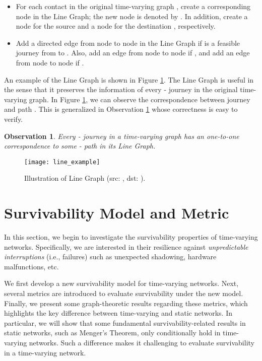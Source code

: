 \documentclass[10pt, conference, letterpaper]{IEEEtran}
\newtheorem{observation}{Observation}
\begin{document}
\begin{itemize}[leftmargin=0.3cm,itemsep=1mm,topsep=1mm]
\item {For each contact  in the original time-varying graph , create a corresponding node in the Line Graph; the new node is denoted by . In addition, create a node for the source  and a node for the destination , respectively.}

\item {Add a directed edge from node  to node  in the Line Graph if  is a feasible journey from  to . Also, add an edge from node  to node  if , and add an edge from node  to node  if .}
\end{itemize}

\noindent An example of the Line Graph is shown in Figure \ref{line_example}. The Line Graph is useful in the sense that it preserves the information of every - journey in the original time-varying graph. In Figure \ref{line_example}, we can observe the correspondence between journey     and path  . This is generalized in Observation \ref{line_corre} whose correctness is easy to verify.
\begin{observation}\label{line_corre}
Every - journey in a time-varying graph has an one-to-one correspondence to some - path in its Line Graph.
\end{observation}\vspace{-5mm}





\begin{figure}[ht]
\begin{center}
\texttt{[image: line\_example]}
\caption{Illustration of Line Graph (src: , dst: ). }
\label{line_example}
\end{center}\vspace{-3mm}
\end{figure}


\section{Survivability Model and Metric}\label{survive_model}
In this section, we begin to investigate the survivability properties of time-varying networks. Specifically, we are interested in their resilience against \emph{unpredictable interruptions} (i.e., failures) such as unexpected shadowing, hardware malfunctions, etc. 

We first develop a new survivability model for time-varying networks. Next, several metrics are introduced to evaluate  survivability under the new model. Finally, we  present some graph-theoretic results regarding these metrics, which highlights the key difference between time-varying and static networks. In particular, we will show that some fundamental survivability-related
results in static networks, such as Menger's Theorem, only conditionally hold in time-varying networks. Such a difference makes it challenging to evaluate survivability in a time-varying network.
\end{document}
